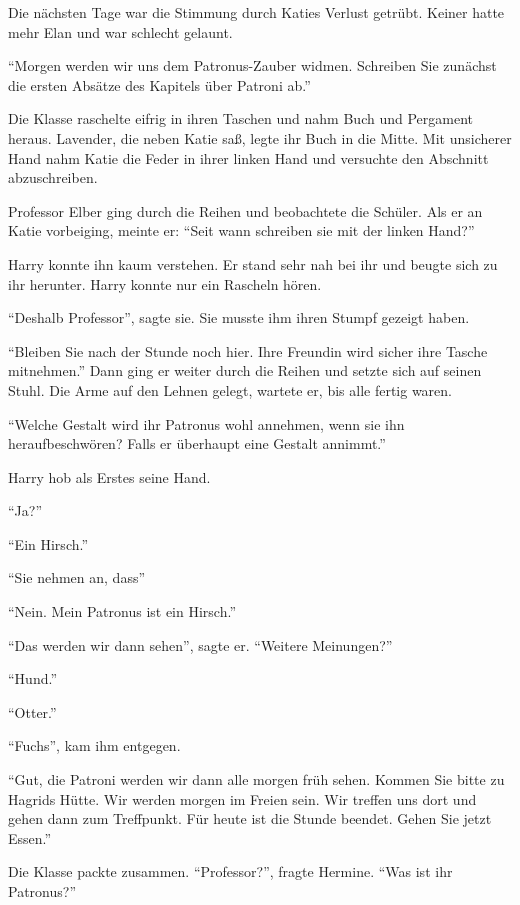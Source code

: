 Die nächsten Tage war die Stimmung durch Katies Verlust getrübt. Keiner hatte mehr Elan und war schlecht gelaunt.

\trenn

\enquote{Morgen werden wir uns dem Patronus-Zauber widmen. Schreiben Sie zunächst die ersten Absätze des Kapitels über Patroni ab.}

Die Klasse raschelte eifrig in ihren Taschen und nahm Buch und Pergament heraus. Lavender, die neben Katie saß, legte ihr Buch in die Mitte. Mit unsicherer Hand nahm Katie die Feder in ihrer linken Hand und versuchte den Abschnitt abzuschreiben.

Professor Elber ging durch die Reihen und beobachtete die Schüler. Als er an Katie vorbeiging, meinte er: \enquote{Seit wann schreiben sie mit der linken Hand?}

Harry konnte ihn kaum verstehen. Er stand sehr nah bei ihr und beugte sich zu ihr herunter. Harry konnte nur ein Rascheln hören.

\enquote{Deshalb Professor}, sagte sie. Sie musste ihm ihren Stumpf gezeigt haben.

\enquote{Bleiben Sie nach der Stunde noch hier. Ihre Freundin wird sicher ihre Tasche mitnehmen.} Dann ging er weiter durch die Reihen und setzte sich auf seinen Stuhl. Die Arme auf den Lehnen gelegt, wartete er, bis alle fertig waren.

\enquote{Welche Gestalt wird ihr Patronus wohl annehmen, wenn sie ihn heraufbeschwören? Falls er überhaupt eine Gestalt annimmt.}

Harry hob als Erstes seine Hand.

\enquote{Ja?}

\enquote{Ein Hirsch.}

\enquote{Sie nehmen an, dass\abs}

\enquote{Nein. Mein Patronus ist ein Hirsch.}

\enquote{Das werden wir dann sehen}, sagte er. \enquote{Weitere Meinungen?}

\enquote{Hund.}

\enquote{Otter.}

\enquote{Fuchs}, kam ihm entgegen.

\enquote{Gut, die Patroni werden wir dann alle morgen früh sehen. Kommen Sie bitte zu Hagrids Hütte. Wir werden morgen im Freien sein. Wir treffen uns dort und gehen dann zum Treffpunkt. Für heute ist die Stunde beendet. Gehen Sie jetzt Essen.}

Die Klasse packte zusammen. \enquote{Professor?}, fragte Hermine. \enquote{Was ist ihr Patronus?}

